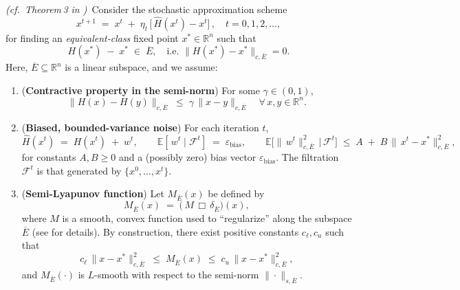 \begin{theorem}\label{thm:biasedNoiseExtended}
\emph{(cf.\ Theorem\,3 in \citep{zhang2021finite})}\,
Consider the stochastic approximation scheme
\begin{equation}\label{eq:updateRule}
  x^{t+1} \;=\; x^t \;+\; \eta_t \,\bigl[\,\widehat{H}(x^t) - x^t\bigr]\,,
  \quad t=0,1,2,\ldots,
\end{equation}
for finding an \emph{equivalent-class} fixed point \(x^*\in\mathbb{R}^n\) such that 
\[
  H(x^*) \;-\; x^* \;\in\;\overline{E},
  \quad \text{i.e. } \|H(x^*) - x^*\|_{c,\overline{E}} = 0.
\]
Here, \(\overline{E}\subseteq \mathbb{R}^n\) is a linear subspace, and we assume:

\begin{enumerate}
\item (\textbf{Contractive property in the semi-norm})
  For some \(\gamma\in(0,1)\),
  \[
    \|H(x) - H(y)\|_{c,\overline{E}}
    \;\le\;
    \gamma\,\|x - y\|_{c,\overline{E}}
    \quad\forall\,x,y\in \mathbb{R}^n.
  \]

\item (\textbf{Biased, bounded-variance noise}) For each iteration \(t\),
  \[
    \widehat{H}(x^t)
    \;=\;
    H(x^t)
    \;+\;
    w^t,
    \qquad
    \mathbb{E}[\,w^t \mid \mathcal{F}^t] 
    \;=\;
    \varepsilon_{\text{bias}}, 
    \qquad
    \mathbb{E}\bigl[\|\,w^t\|_{c,\overline{E}}^2 \,\big|\,
      \mathcal{F}^t\bigr]
    \;\le\;
    A 
    \;+\;
    B\,\|\,x^t - x^*\|_{c,\overline{E}}^2,
  \]
  for constants \(A,B \ge 0\) and a (possibly zero) bias vector \(\varepsilon_{\text{bias}}\).  
  The filtration \(\mathcal{F}^t\) is that generated by \(\{x^0,\ldots,x^t\}\).

\item (\textbf{Semi-Lyapunov function})
  Let \(M_{\overline{E}}(x)\) be defined by
  \[
    M_{\overline{E}}(x) 
    \;=\;
    \bigl(\,M \,\Box\, \delta_{\overline{E}}\bigr)(x),
  \]
  where \(M\) is a smooth, convex function used to ``regularize'' along the subspace \(\overline{E}\) (see \citep{zhang2021finite} for details). 
  By construction, there exist positive constants \(c_\ell,c_u\) such that
  \[
    c_\ell\,\|x - x^*\|_{c,\overline{E}}^2
    \;\le\;
    M_{\overline{E}}(x)
    \;\le\;
    c_u\,\|x - x^*\|_{c,\overline{E}}^2,
  \]
  and \(M_{\overline{E}}(\cdot)\) is \(L\)-smooth with respect to the semi-norm \(\|\cdot\|_{s,\overline{E}}\).  
\end{enumerate}


\end{theorem}
